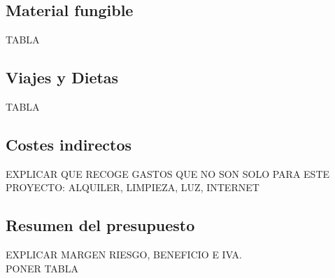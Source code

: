 \subsection{Material fungible}
TABLA

\subsection{Viajes y Dietas}
TABLA

\subsection{Costes indirectos}
EXPLICAR QUE RECOGE GASTOS QUE NO SON SOLO PARA ESTE PROYECTO: ALQUILER, LIMPIEZA, LUZ, INTERNET

\subsection{Resumen del presupuesto}
EXPLICAR MARGEN RIESGO, BENEFICIO E IVA. \\ PONER TABLA